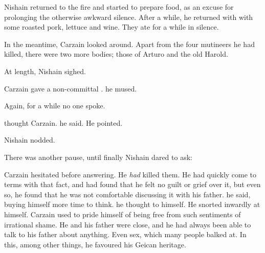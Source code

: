 Nishain returned to the fire and started to prepare food, as an excuse for prolonging the otherwise awkward silence. 
After a while, he returned with with some roasted pork, lettuce and wine. 
They ate for a while in silence. 



In the meantime, Carzain looked around. 
Apart from the four mutineers he had killed, there were two more bodies; those of Arturo and the old Harold. 

At length, Nishain sighed. 

Carzain gave a non-committal . 
 he mused. 

Again, for a while no one spoke. 

 thought Carzain. 
 he said. 
 He pointed. 

Nishain nodded. 

There was another pause, until finally Nishain dared to ask: 

Carzain hesitated before answering. 
He \emph{had} killed them. 
He had quickly come to terms with that fact, and had found that he felt no guilt or grief over it, but even so, he found that he was not comfortable discussing it with his father. 
 he said, buying himself more time to think. 
 he thought to himself. 
 He snorted inwardly at himself. 
Carzain used to pride himself of being free from such sentiments of irrational shame. 
He and his father were close, and he had always been able to talk to his father about anything. 
Even sex, which many people balked at. 
In this, among other things, he favoured his Geican heritage. 

